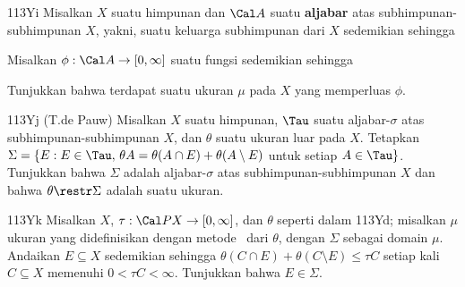 {\spheader 113Yi Misalkan $X$ suatu himpunan dan $\Cal A$ suatu {\bf aljabar}
atas subhimpunan-subhimpunan $X$, yakni, suatu keluarga subhimpunan dari $X$ sedemikian sehingga


\noindent Misalkan $\phi:\Cal A\to[0,\infty]$ suatu fungsi sedemikian sehingga


\noindent Tunjukkan bahwa terdapat suatu ukuran $\mu$ pada $X$ yang memperluas $\phi$.

\spheader 113Yj (T.de Pauw) Misalkan $X$ suatu himpunan, $\Tau$ suatu
aljabar-$\sigma$ atas subhimpunan-subhimpunan $X$, dan $\theta$ suatu ukuran luar pada
$X$. Tetapkan
$\Sigma=\{E:E\in\Tau,\,\theta A=\theta(A\cap E)+\theta(A\setminus E)$
untuk setiap $A\in\Tau\}$. Tunjukkan bahwa $\Sigma$ adalah
aljabar-$\sigma$ atas subhimpunan-subhimpunan $X$ dan bahwa $\theta\restr\Sigma$ adalah suatu
ukuran.

\spheader 113Yk Misalkan $X$, $\tau:\Cal PX\to[0,\infty]$, dan
$\theta$ seperti dalam 113Yd; misalkan $\mu$ ukuran yang didefinisikan
dengan metode \Caratheodory\ dari $\theta$, dengan $\Sigma$ sebagai domain $\mu$.
Andaikan $E\subseteq X$ sedemikian sehingga
$\theta(C\cap E)+\theta(C\setminus E)\le\tau C$ setiap kali $C\subseteq X$
memenuhi $0<\tau C<\infty$. Tunjukkan bahwa $E\in\Sigma$.
}%

